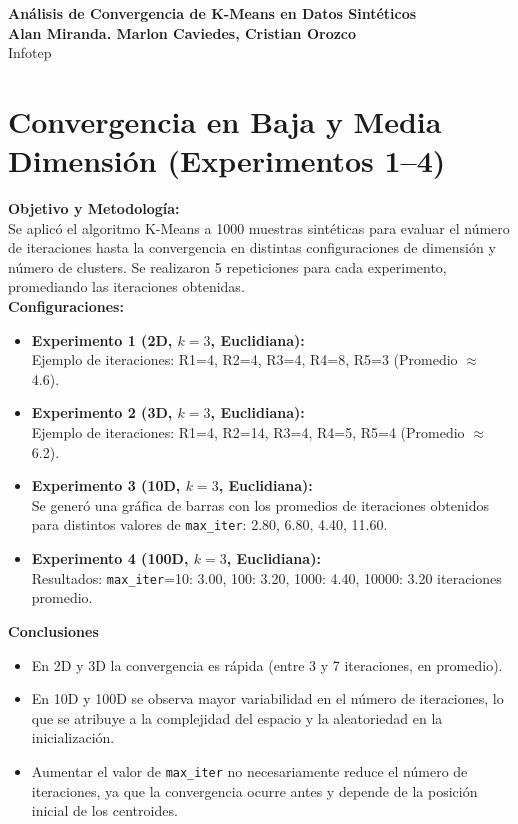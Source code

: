 \documentclass[a4paper, 10pt]{article}
\begin{document}
\begin{center}
\LARGE \textbf{Análisis de Convergencia de K-Means en Datos Sintéticos}\\[12pt]
\small \textbf{Alan Miranda. Marlon Caviedes, Cristian Orozco} \\
Infotep \\
\end{center}

\section*{Convergencia en Baja y Media Dimensión (Experimentos 1--4)}
\textbf{Objetivo y Metodología:}\\[4pt]
Se aplicó el algoritmo K-Means a 1000 muestras sintéticas para evaluar el número de iteraciones hasta la convergencia en distintas configuraciones de dimensión y número de clusters. Se realizaron 5 repeticiones para cada experimento, promediando las iteraciones obtenidas.\\[4pt]

\textbf{Configuraciones:}
\begin{itemize}
  \item \textbf{Experimento 1 (2D, $k=3$, Euclidiana):}\\
        Ejemplo de iteraciones: R1=4, R2=4, R3=4, R4=8, R5=3 (Promedio $\approx$ 4.6).
  \item \textbf{Experimento 2 (3D, $k=3$, Euclidiana):}\\
        Ejemplo de iteraciones: R1=4, R2=14, R3=4, R4=5, R5=4 (Promedio $\approx$ 6.2).
  \item \textbf{Experimento 3 (10D, $k=3$, Euclidiana):}\\
        Se generó una gráfica de barras con los promedios de iteraciones obtenidos para distintos valores de \texttt{max\_iter}: 2.80, 6.80, 4.40, 11.60.
  \item \textbf{Experimento 4 (100D, $k=3$, Euclidiana):}\\
        Resultados: \texttt{max\_iter}=10: 3.00, 100: 3.20, 1000: 4.40, 10000: 3.20 iteraciones promedio.
\end{itemize}


\textbf{Conclusiones}
\begin{itemize}
  \item En 2D y 3D la convergencia es rápida (entre 3 y 7 iteraciones, en promedio).
  \item En 10D y 100D se observa mayor variabilidad en el número de iteraciones, lo que se atribuye a la complejidad del espacio y la aleatoriedad en la inicialización.
  \item Aumentar el valor de \texttt{max\_iter} no necesariamente reduce el número de iteraciones, ya que la convergencia ocurre antes y depende de la posición inicial de los centroides.
\end{itemize}
\end{document}
